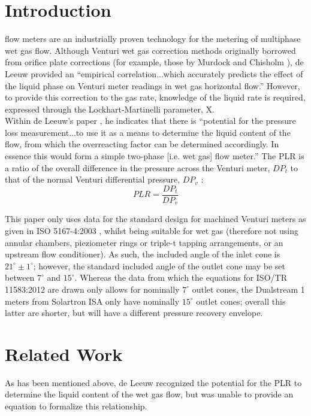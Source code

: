 \documentclass[journal]{IEEEtran}
\begin{document}
\section{Introduction}
 flow meters are an industrially proven technology for the metering of multiphase wet gas flow. Although Venturi wet gas correction methods originally borrowed from orifice plate corrections (for example, those by Murdock \cite{Murdock1962} and Chisholm \cite{Chisholm1977}), de Leeuw \cite{DeLeeuw1997} provided an ``empirical correlation...which accurately predicts the effect of the liquid phase on Venturi meter readings in wet gas horizontal flow.''  However, to provide this correction to the gas rate, knowledge of the liquid rate is required, expressed through the Lockhart-Martinelli parameter, \acrshort{X}.\\

Within de Leeuw's paper \cite{DeLeeuw1997}, he indicates that there is ``potential for the pressure loss measurement...to use it as a means to determine the liquid content of the flow, from which the overreacting factor can be determined accordingly. In essence this would form a simple two-phase [i.e. wet gas] flow meter.''  The \acrlong{PLR} is a ratio of the overall difference in the pressure across the Venturi meter, $DP_{t}$ to that of the normal Venturi differential pressure, $DP_{v}$ :
\begin{equation}
    PLR = \frac{DP_{t}}{DP_{v}}
\end{equation}


This paper only uses data for the standard design for machined Venturi meters as given in ISO 5167-4:2003 \cite{2003ISOTubes}, whilst being suitable for wet gas (therefore not using annular chambers, pieziometer rings or triple-t tapping arrangements, or an upstream flow conditioner).  As such, the included angle of the inlet cone is $21^{\circ} \pm 1^{\circ}$; however, the standard included angle of the outlet cone may be set between $7^{\circ}$ and $15^{\circ}$.  Whereas the data from which the equations for ISO/TR 11583:2012 are drawn only allows for nominally $7^{\circ}$ outlet cones, the Dualstream 1 meters from Solartron ISA only have nominally $15^{\circ}$ outlet cones; overall this latter are shorter, but will have a different pressure recovery envelope.

\section{Related Work}
As has been mentioned above, de Leeuw \cite{DeLeeuw1997} recognized the potential for the \acrshort{PLR} to determine the liquid content of the wet gas flow, but was unable to provide an equation to formalize this relationship.  
\end{document}
